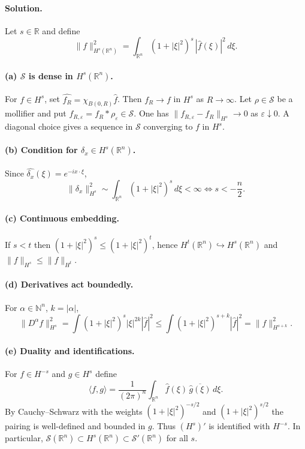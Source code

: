 \documentclass[12pt,a4paper]{article}
\theoremstyle{plain}
\theoremstyle{definition}
\theoremstyle{remark}
\theoremstyle{remark}
\begin{document}
\bigskip

\paragraph{Solution.}

Let $s\in\mathbb R$ and define
\[
\|f\|_{H^s(\mathbb R^n)}^2=\int_{\mathbb R^n}(1+|\xi|^2)^s\,|\widehat f(\xi)|^2\,d\xi.
\]

\paragraph{(a) $\mathcal S$ is dense in $H^s(\mathbb R^n)$.}
For $f\in H^s$, set $\widehat{f_R}=\chi_{B(0,R)}\widehat f$. Then $f_R\to f$ in $H^s$ as $R\to\infty$.
Let $\rho\in\mathcal S$ be a mollifier and put $f_{R,\varepsilon}=f_R*\rho_\varepsilon\in\mathcal S$.
One has $\|f_{R,\varepsilon}-f_R\|_{H^s}\to0$ as $\varepsilon\downarrow0$. A diagonal choice gives a sequence in $\mathcal S$ converging to $f$ in $H^s$.

\smallskip

\paragraph{(b) Condition for $\delta_x\in H^s(\mathbb R^n)$.}
Since $\widehat{\delta_x}(\xi)=e^{-ix\cdot\xi}$,
\[
\|\delta_x\|_{H^s}^2\sim\int_{\mathbb R^n}(1+|\xi|^2)^s\,d\xi<\infty
\iff s<-\frac n2.
\]

\smallskip

\paragraph{(c) Continuous embedding.}
If $s<t$ then $(1+|\xi|^2)^s\le(1+|\xi|^2)^t$, hence $H^t(\mathbb R^n)\hookrightarrow H^s(\mathbb R^n)$ and
$\|f\|_{H^s}\le \|f\|_{H^t}$.

\smallskip

\paragraph{(d) Derivatives act boundedly.}
For $\alpha\in\mathbb N^n$, $k=|\alpha|$,
\[
\|D^\alpha f\|_{H^s}^2
=\int (1+|\xi|^2)^s |\xi|^{2k} |\widehat f|^2
\le \int (1+|\xi|^2)^{s+k} |\widehat f|^2
=\|f\|_{H^{s+k}}^2.
\]

\smallskip

\paragraph{(e) Duality and identifications.}
For $f\in H^{-s}$ and $g\in H^s$ define
\[
\langle f,g\rangle=\frac{1}{(2\pi)^n}\int_{\mathbb R^n}\widehat f(\xi)\,\overline{\widehat g(\xi)}\,d\xi.
\]
By Cauchy--Schwarz with the weights $(1+|\xi|^2)^{-s/2}$ and $(1+|\xi|^2)^{s/2}$ the pairing is well-defined and bounded in $g$.
Thus $(H^s)'$ is identified with $H^{-s}$. In particular, $\mathcal S(\mathbb R^n)\subset H^s(\mathbb R^n)\subset\mathcal S'(\mathbb R^n)$ for all $s$.
\end{document}
